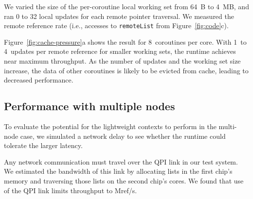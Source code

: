 \documentclass[10pt,nocopyrightspace]{sigplanconf}
\newcommand{\mrps}[1]{\unit[#1]{Mref/s}}
\begin{document}
We varied the size of the per-coroutine local working set from 64~B
to 4~MB, and ran 0 to 32 local updates for each remote pointer
traversal. We measured the remote reference rate (i.e., accesses to \texttt{remoteList} from Figure~\ref{fig:code}c).

Figure~\ref{fig:cache-pressure}a shows the result for 8~coroutines per
core.  With 1~to 4~updates per remote reference for smaller working
sets, the runtime achieves near maximum throughput. 
As the number of updates and the working set size increase, the data
of other coroutines is likely to be evicted from cache, leading to
decreased performance.


\subsection{Performance with multiple nodes}

To evaluate the potential for the lightweight contexts to perform in
the multi-node case, we simulated a network delay to see whether the
runtime could tolerate the larger latency.

Any network communication must travel over the QPI link in our test
system. We estimated the bandwidth of this link by allocating lists in
the first chip's memory and traversing those lists on the second
chip's cores. We found that use of the QPI link limits throughput to
\mrps{175}.

\end{document}
